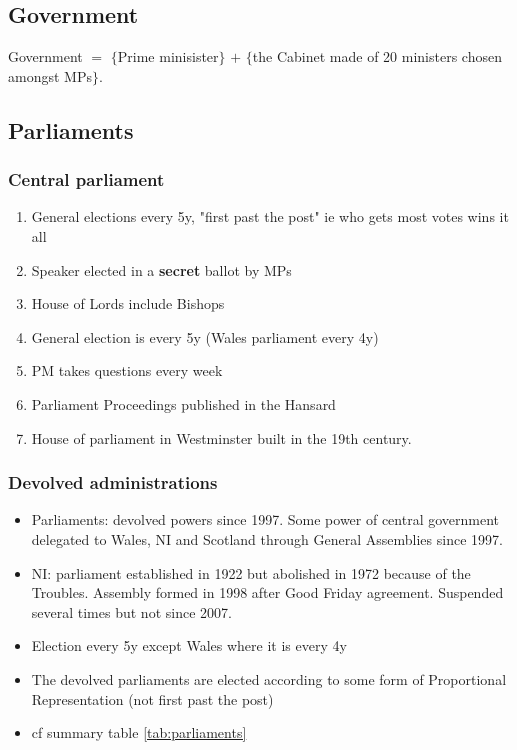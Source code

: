 \documentclass{amsart}
\begin{document}
\subsection{Government}
Government $=$ $\{$Prime minisister$\}$ $+$ $\{$the Cabinet made of 20 ministers chosen amongst MPs$\}$.

\subsection{Parliaments}


\subsubsection{Central parliament}



\begin{enumerate}
\item General elections every 5y, "first past the post" ie who gets most votes wins it all
\item Speaker elected in a \textbf{secret} ballot by MPs
\item House of Lords include Bishops
\item General election is every 5y (Wales parliament every 4y)
\item PM takes questions every week
\item Parliament Proceedings published in the Hansard
\item House of parliament in Westminster built in the 19th century.
\end{enumerate}

\subsubsection{Devolved administrations}
\begin{itemize}
\item Parliaments: devolved powers since 1997. Some power of central government delegated to Wales, NI and Scotland through General Assemblies since 1997.
\item NI: parliament established in 1922 but abolished in 1972 because of the Troubles. Assembly formed in 1998 after Good Friday agreement.  Suspended several times but not since 2007.
\item Election every 5y except Wales where it is every 4y
\item The devolved parliaments are elected according to some form of Proportional Representation (not first past the post)
\item cf summary table \ref{tab:parliaments}
\end{itemize}
\end{document}
